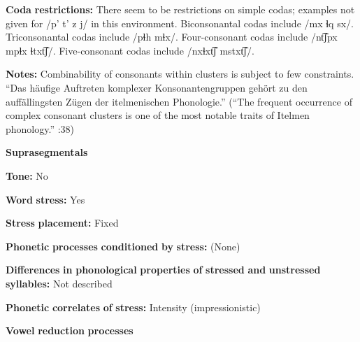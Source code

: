 \documentclass[output=paper]{langsci/langscibook}
\begin{document}
\begin{styleBody}
\textbf{Coda} \textbf{restrictions:} There seem to be restrictions on simple codas; examples not given for /p’ t’ z j/ in this environment. Biconsonantal codas include /mx ɬq sx/. Triconsonantal codas include /pɬh mɬx/. Four-consonant codas include /nt͡ʃpx mpɬx ɬtxt͡ʃ/. Five-consonant codas include /nxɬxt͡ʃ mstxt͡ʃ/.
\end{styleBody}

\begin{styleBody}
\textbf{Notes:} Combinability of consonants within clusters is subject to few constraints. “Das häufige Auftreten komplexer Konsonantengruppen gehört zu den auffällingsten Zügen der itelmenischen Phonologie.” (“The frequent occurrence of complex consonant clusters is one of the most notable traits of Itelmen phonology.” \citealt{GeorgVolodin1999}:38)
\end{styleBody}

\begin{styleBody}
\textbf{Suprasegmentals}
\end{styleBody}

\begin{styleBody}
\textbf{Tone:} No
\end{styleBody}

\begin{styleBody}
\textbf{Word} \textbf{stress:} Yes
\end{styleBody}

\begin{styleBody}
\textbf{Stress} \textbf{placement:} Fixed
\end{styleBody}

\begin{styleBody}
\textbf{Phonetic} \textbf{processes} \textbf{conditioned} \textbf{by} \textbf{stress:} (None)
\end{styleBody}

\begin{styleBody}
\textbf{Differences} \textbf{in} \textbf{phonological} \textbf{properties} \textbf{of} \textbf{stressed} \textbf{and} \textbf{unstressed} \textbf{syllables:} Not described
\end{styleBody}

\begin{styleBody}
\textbf{Phonetic} \textbf{correlates} \textbf{of} \textbf{stress:} Intensity (impressionistic)
\end{styleBody}

\begin{styleBody}
\textbf{Vowel} \textbf{reduction} \textbf{processes}
\end{styleBody}
\end{document}
